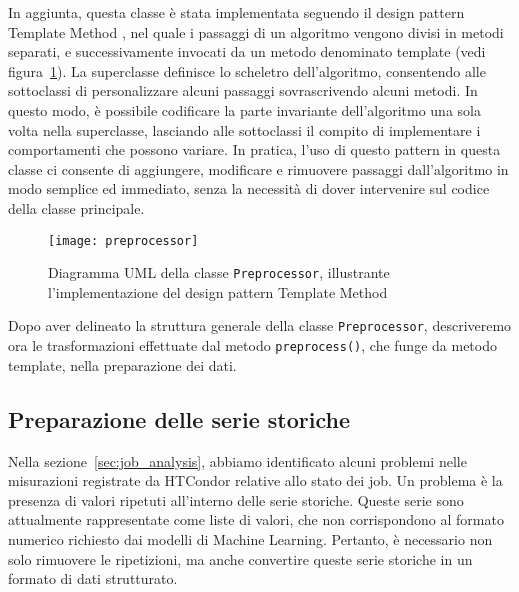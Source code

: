 In aggiunta, questa classe è stata implementata seguendo il design pattern
Template Method \cite{gamma1994}, nel quale i passaggi di un algoritmo vengono
divisi in metodi separati, e successivamente invocati da un metodo denominato
template (vedi figura~\ref{fig:uml_preprocessor}). La superclasse definisce lo
scheletro dell'algoritmo, consentendo alle sottoclassi di personalizzare
alcuni passaggi sovrascrivendo alcuni metodi. In questo modo, è possibile
codificare la parte invariante dell'algoritmo una sola volta nella
superclasse, lasciando alle sottoclassi il compito di implementare i
comportamenti che possono variare. In pratica, l'uso di questo pattern in
questa classe ci consente di aggiungere, modificare e rimuovere passaggi
dall'algoritmo in modo semplice ed immediato, senza la necessità di dover
intervenire sul codice della classe principale.

\begin{figure}[!ht]
   \centering
   \texttt{[image: preprocessor]}
   \caption{Diagramma UML della classe \texttt{Preprocessor}, illustrante
   l'implementazione del design pattern Template Method}
   \label{fig:uml_preprocessor}
\end{figure}

Dopo aver delineato la struttura generale della classe \texttt{Preprocessor},
descriveremo ora le trasformazioni effettuate dal metodo
\texttt{preprocess()}, che funge da metodo template, nella preparazione dei
dati.

\subsection{Preparazione delle serie storiche}

Nella sezione~\ref{sec:job_analysis}, abbiamo identificato alcuni problemi
nelle misurazioni registrate da HTCondor relative allo stato dei job. Un
problema è la presenza di valori ripetuti all'interno delle serie storiche.
Queste serie sono attualmente rappresentate come liste di valori, che non
corrispondono al formato numerico richiesto dai modelli di Machine Learning.
Pertanto, è necessario non solo rimuovere le ripetizioni, ma anche convertire
queste serie storiche in un formato di dati strutturato.

